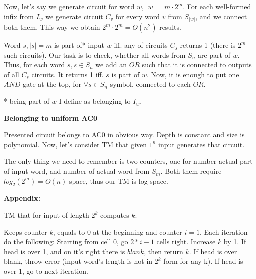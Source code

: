 \documentclass[12pt]{article}
\begin{document}
Now, let's say we generate circuit for word $w$, $|w| = m\cdot2^m$.
For each well-formed infix from $I_w$ we generate circuit $C_v$ for every word $v$ from $S_{|w|}$, and we connect both them. This way we obtain $2^m \cdot 2^m = O(n^2)$ results. 

Word $s, |s| = m$ is part of* input $w$ iff. any of circuits $C_s$ returns 1 (there is $2^m$ such circuits). Our task is to check, whether all words from $S_n$ are part of $w$. Thus, for each word $s, s \in S_n$ we add an $OR$ such that it is connected to outputs of all $C_s$ circuits. It returns 1 iff. $s$ is part of $w$.
Now, it is enough to put one $AND$ gate at the top, for $\forall{s \in S_n}$ symbol, connected to each $OR$.

* being part of $w$ I define as belonging to $I_w$.


\textbf{Belonging to uniform AC0}

Presented circuit belongs to AC0 in obvious way. Depth is constant and size is polynomial. Now, let's consider TM that given $1^n$ input generates that circuit.

The only thing we need to remember is two counters, one for number actual part of input word, and number of actual word from $S_m$. Both them require $log_2(2^m) = O(n)$ space, thus our TM is log-space.

\textbf{Appendix:}

TM that for input of length $2^k$ computes $k$:

Keeps counter $k$, equals to 0 at the beginning and counter $i = 1$. Each iteration do the following:
Starting from cell 0, go $2*i - 1$ cells right. Increase $k$ by 1. If head is over 1, and on it's right there is $blank$, then return $k$. If head is over blank, throw error (input word's length is not in $2^k$ form for any k). If head is over 1, go to next iteration.
\end{document}
